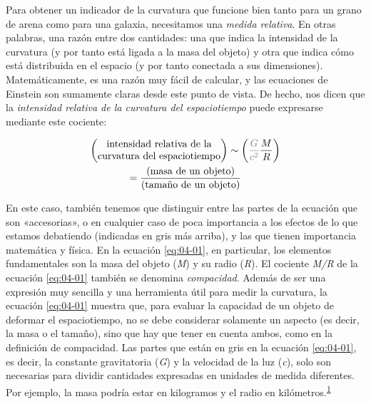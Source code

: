 Para obtener un indicador de la curvatura que funcione bien tanto para un grano de
arena como para una galaxia, necesitamos una \emph{medida relativa}. En otras
palabras, una razón entre dos cantidades: una que indica la intensidad de la
curvatura (y por tanto está ligada a la masa del objeto) y otra que indica cómo está
distribuida en el espacio (y por tanto conectada a sus dimensiones). Matemáticamente,
es una razón muy fácil de calcular, y las ecuaciones de Einstein son sumamente
claras desde este punto de vista. De hecho, nos dicen que la \emph{intensidad
relativa de la curvatura del espaciotiempo}
puede expresarse mediante este cociente:

\begin{equation}\label{eq:04-01}
\begin{gathered}
\begin{pmatrix}\text{intensidad relativa de la} \\ \text{curvatura del espaciotiempo}\end{pmatrix}
\sim \left(\textcolor{gray}{\frac{G}{c^{2}}}\frac{M}{R}\right) \\
= \frac{(\text{masa de un objeto})}{(\text{tamaño de un objeto})}
\end{gathered}
\end{equation}


En este caso, también tenemos que distinguir entre las partes de la ecuación que
son «accesorias», o en cualquier caso de poca importancia a los efectos de lo que
estamos debatiendo (indicadas en gris más arriba), y las que tienen importancia
matemática y física. En la ecuación \eqref{eq:04-01}, en particular, los elementos
fundamentales son la masa del objeto (\emph{M}) y su radio (\emph{R}). El cociente
\emph{M/R} de la ecuación \eqref{eq:04-01} también se denomina
\emph{compacidad}. Además de ser una expresión muy sencilla y una
herramienta útil para medir la curvatura, la ecuación \eqref{eq:04-01} muestra que,
para evaluar la capacidad de un objeto de deformar el espaciotiempo, no se debe
considerar solamente un aspecto (es decir, la masa o el tamaño), sino que hay que
tener en cuenta ambos, como en la definición de compacidad. Las partes que están en
gris en la ecuación \eqref{eq:04-01}, es decir, la constante gravitatoria
(\emph{G}) y la velocidad de la luz (\emph{c}), solo son necesarias para dividir
cantidades expresadas en unidades de medida diferentes. Por ejemplo, la masa podría
estar en kilogramos y el radio en kilómetros.\textsuperscript{\hyperlink{note:04-01}{1}}

